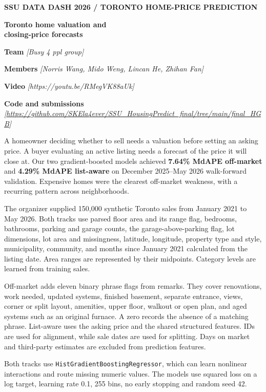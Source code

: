 \documentclass[11pt]{article}
\newcommand{\field}[1]{\textcolor{pending}{\textit{[#1]}}}
\newcommand{\reportsection}[1]{\vspace{6pt}{\large\bfseries\color{navy} #1}\par\vspace{1pt}}
\begin{document}
{\small\bfseries\color{muted} SSU DATA DASH 2026 \quad / \quad TORONTO HOME-PRICE PREDICTION}\par
\vspace{8pt}
{\LARGE\bfseries\color{navy} Toronto home valuation and\\ closing-price forecasts}\par
\vspace{5pt}
\textbf{Team} \field{Busy 4 ppl group}\par
\textbf{Members} \field{Norris Wang, Mido Weng, Lincan He, Zhihan Fan}\par
\textbf{Video} \field{https://youtu.be/RMegVK88aUk}\par
\textbf{Code and submissions} \field{\url{https://github.com/SKEla4ever/SSU_HousingPredict_final/tree/main/final_HGB}}\par

\reportsection{Summary}
A homeowner deciding whether to sell needs a valuation before setting an asking price. A buyer evaluating an active listing needs a forecast of the price it will close at. Our two gradient-boosted models achieved \textbf{7.64\% MdAPE off-market} and \textbf{4.29\% MdAPE list-aware} on December 2025--May 2026 walk-forward validation. Expensive homes were the clearest off-market weakness, with a recurring pattern across neighborhoods.

\reportsection{Data and features}
The organizer supplied 150,000 synthetic Toronto sales from January 2021 to May 2026. Both tracks use parsed floor area and its range flag, bedrooms, bathrooms, parking and garage counts, the garage-above-parking flag, lot dimensions, lot area and missingness, latitude, longitude, property type and style, municipality, community, and months since January 2021 calculated from the listing date. Area ranges are represented by their midpoints. Category levels are learned from training sales.

Off-market adds eleven binary phrase flags from remarks. They cover renovations, work needed, updated systems, finished basement, separate entrance, views, corner or split layout, amenities, upper floor, walkout or open plan, and aged systems such as an original furnace. A zero records the absence of a matching phrase. List-aware uses the asking price and the shared structured features. IDs are used for alignment, while sale dates are used for splitting. Days on market and third-party estimates are excluded from prediction features.

\reportsection{Models}
Both tracks use \texttt{HistGradientBoostingRegressor}, which can learn nonlinear interactions and route missing numeric values. The models use squared loss on a log target, learning rate 0.1, 255 bins, no early stopping and random seed 42.
\end{document}
